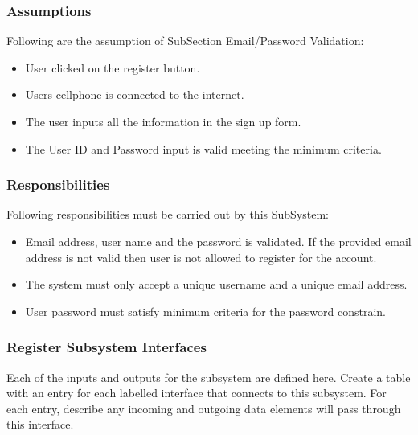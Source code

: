 \subsubsection{Assumptions}
Following are the assumption of SubSection Email/Password Validation:
\begin{itemize}
    \item User clicked on the register button.
    \item Users cellphone is connected to the internet.
    \item The user inputs all the information in the sign up form.
    \item The User ID and Password input is valid meeting the minimum criteria.
\end{itemize}
\subsubsection{Responsibilities}
Following responsibilities must be carried out by this SubSystem:
\begin{itemize}
    \item Email address, user name and the password is validated. If the provided email address is not valid then user is not allowed to register for the account.
    \item The system must only accept a unique username and a unique email address.
    \item User password must satisfy minimum criteria for the password constrain.
\end{itemize}

\subsubsection{Register Subsystem Interfaces}
Each of the inputs and outputs for the subsystem are defined here. Create a table with an entry for each labelled interface that connects to this subsystem. For each entry, describe any incoming and outgoing data elements will pass through this interface.

